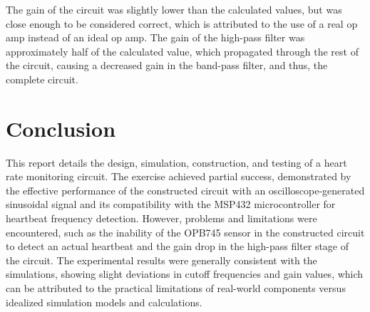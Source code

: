 \documentclass[CMPE]{KGCOEReport}
\begin{document}
The gain of the circuit was slightly lower than the calculated values, but was close enough to be considered correct, which is attributed to the use of a real op amp instead of an ideal op amp. The gain of the high-pass filter was approximately half of the calculated value, which propagated through the rest of the circuit, causing a decreased gain in the band-pass filter, and thus, the complete circuit.

\section*{Conclusion}

This report details the design, simulation, construction, and testing of a heart rate monitoring circuit. The exercise achieved partial success, demonstrated by the effective performance of the constructed circuit with an oscilloscope-generated sinusoidal signal and its compatibility with the MSP432 microcontroller for heartbeat frequency detection. However, problems and limitations were encountered, such as the inability of the OPB745 sensor in the constructed circuit to detect an actual heartbeat and the gain drop in the high-pass filter stage of the circuit. The experimental results were generally consistent with the simulations, showing slight deviations in cutoff frequencies and gain values, which can be attributed to the practical limitations of real-world components versus idealized simulation models and calculations.
\end{document}
